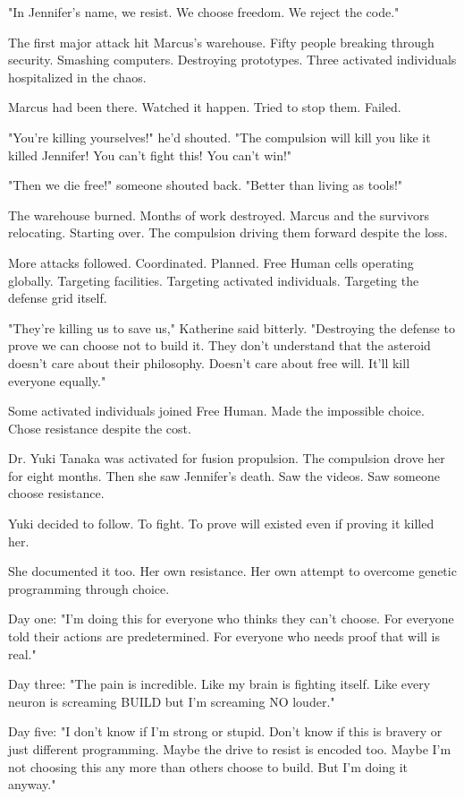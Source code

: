 "In Jennifer's name, we resist. We choose freedom. We reject the code."

The first major attack hit Marcus's warehouse. Fifty people breaking through security. Smashing computers. Destroying prototypes. Three activated individuals hospitalized in the chaos.

Marcus had been there. Watched it happen. Tried to stop them. Failed.

"You're killing yourselves!" he'd shouted. "The compulsion will kill you like it killed Jennifer! You can't fight this! You can't win!"

"Then we die free!" someone shouted back. "Better than living as tools!"

The warehouse burned. Months of work destroyed. Marcus and the survivors relocating. Starting over. The compulsion driving them forward despite the loss.

More attacks followed. Coordinated. Planned. Free Human cells operating globally. Targeting facilities. Targeting activated individuals. Targeting the defense grid itself.

"They're killing us to save us," Katherine said bitterly. "Destroying the defense to prove we can choose not to build it. They don't understand that the asteroid doesn't care about their philosophy. Doesn't care about free will. It'll kill everyone equally."

\scenebreak

Some activated individuals joined Free Human. Made the impossible choice. Chose resistance despite the cost.

Dr. Yuki Tanaka was activated for fusion propulsion. The compulsion drove her for eight months. Then she saw Jennifer's death. Saw the videos. Saw someone choose resistance.

Yuki decided to follow. To fight. To prove will existed even if proving it killed her.

She documented it too. Her own resistance. Her own attempt to overcome genetic programming through choice.

Day one: "I'm doing this for everyone who thinks they can't choose. For everyone told their actions are predetermined. For everyone who needs proof that will is real."

Day three: "The pain is incredible. Like my brain is fighting itself. Like every neuron is screaming BUILD but I'm screaming NO louder."

Day five: "I don't know if I'm strong or stupid. Don't know if this is bravery or just different programming. Maybe the drive to resist is encoded too. Maybe I'm not choosing this any more than others choose to build. But I'm doing it anyway."


